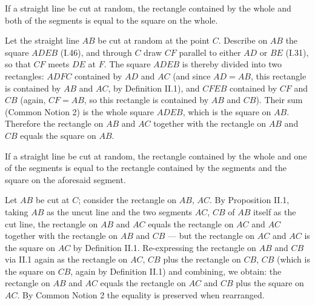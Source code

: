 \begin{claim}
\label{prop:II.2}
If a straight line be cut at random, the rectangle contained by the
whole and both of the segments is equal to the square on the whole.
\end{claim}
\begin{evidence}[Proof of II.2]
\label{ev:II.2}
Let the straight line $AB$ be cut at random at the point $C$.
Describe on $AB$ the square $ADEB$ (I.46), and through $C$ draw
$CF$ parallel to either $AD$ or $BE$ (I.31), so that $CF$ meets $DE$
at $F$.  The square $ADEB$ is thereby divided into two rectangles:
$ADFC$ contained by $AD$ and $AC$ (and since $AD = AB$, this rectangle
is contained by $AB$ and $AC$, by Definition II.1), and $CFEB$
contained by $CF$ and $CB$ (again, $CF = AB$, so this rectangle is
contained by $AB$ and $CB$).  Their sum (Common Notion 2) is the
whole square $ADEB$, which is the square on $AB$.  Therefore the
rectangle on $AB$ and $AC$ together with the rectangle on $AB$ and
$CB$ equals the square on $AB$.
\end{evidence}

\begin{claim}
\label{prop:II.3}
If a straight line be cut at random, the rectangle contained by the
whole and one of the segments is equal to the rectangle contained by
the segments and the square on the aforesaid segment.
\end{claim}
\begin{evidence}[Proof of II.3]
\label{ev:II.3}
Let $AB$ be cut at $C$; consider the rectangle on $AB$, $AC$.  By
Proposition II.1, taking $AB$ as the uncut line and the two segments
$AC$, $CB$ of $AB$ itself as the cut line, the rectangle on $AB$ and
$AC$ equals the rectangle on $AC$ and $AC$ together with the
rectangle on $AB$ and $CB$ --- but the rectangle on $AC$ and $AC$ is
the square on $AC$ by Definition II.1.  Re-expressing the rectangle
on $AB$ and $CB$ via II.1 again as the rectangle on $AC$, $CB$ plus
the rectangle on $CB$, $CB$ (which is the square on $CB$, again by
Definition II.1) and combining, we obtain:
the rectangle on $AB$ and $AC$ equals the rectangle on $AC$ and
$CB$ plus the square on $AC$.  By Common Notion 2 the equality is
preserved when rearranged.
\end{evidence}

